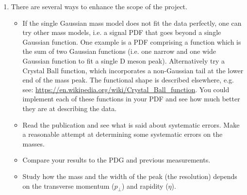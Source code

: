 \begin{enumerate}
\item There are several ways to enhance the scope of the project.
\begin{itemize} 
\item If the single Gaussian mass model does not fit the data perfectly, one can try other mass models, i.e. a signal PDF that goes beyond a single Gaussian function.
One example is a PDF comprising a function which is the sum of two Gaussian functions (i.e. one narrow and one wide Gaussian function to fit a single D meson peak).
Alternatively try a Crystal Ball function, which incorporates a non-Gaussian tail at the lower end of the mass peak.
The functional shape is described elsewhere, e.g. see: \url{https://en.wikipedia.org/wiki/Crystal_Ball_function}.
You could implement each of these functions in your PDF and see how much better they are at describing the data.
\item Read the publication and see what is said about systematic errors.
Make a reasonable attempt at determining some systematic errors on the masses.
\item Compare your results to the PDG and previous measurements.
\item Study how the mass and the width of the peak (the resolution) depends on the transverse momentum ($p_\perp$) and rapidity ($\eta$).
\end{itemize}



\end{enumerate}

 
 

